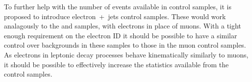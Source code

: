To further help with the number of events available in control samples, it is
proposed to introduce electron~+~jets control samples. These would work
analagously to the \mj and \mmj samples, with electrons in place of muons. With
a tight enough requirement on the electron ID it should be possible to have a
similar control over backgrounds in these samples to those in the muon control
samples. As electrons in leptonic decay processes behave kinematically similarly
to muons, it should be possible to effectively increase the statistics available
from the control samples. 
